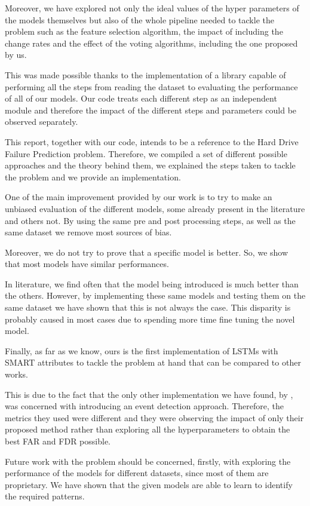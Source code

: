 Moreover, we have explored not only the ideal values of the hyper parameters of the models themselves but also of the whole pipeline needed to tackle the problem such as the feature selection algorithm, the impact of including the change rates and the effect of the voting algorithms, including the one proposed by us.

This was made possible thanks to the implementation of a library capable of performing all the steps from reading the dataset to evaluating the performance of all of our models.
Our code treats each different step as an independent module and therefore the impact of the different steps and parameters could be observed separately.

This report, together with our code, intends to be a reference to the Hard Drive Failure Prediction problem.
Therefore, we compiled a set of different possible approaches and the theory behind them, we explained the steps taken to tackle the problem and we provide an implementation.

One of the main improvement provided by our work is to try to make an unbiased evaluation of the different models, some already present in the literature and others not.
By using the same pre and post processing steps, as well as the same dataset we remove most sources of bias.

Moreover, we do not try to prove that a specific model is better.
So, we show that most models have similar performances.

In literature, we find often that the model being introduced is much better than the others. 
However, by implementing these same models and testing them on the same dataset we have shown that this is not always the case.
This disparity is probably caused in most cases due to spending more time fine tuning the novel model.

Finally, as far as we know, ours is the first implementation of LSTMs with SMART attributes to tackle the problem at hand that can be compared to other works.

This is due to the fact that the only other implementation we have found, by \cite{zhang2017deep}, was concerned with introducing an event detection approach.
Therefore, the metrics they used were different and they were observing the impact of only their proposed method rather than exploring all the hyperparameters to obtain the best FAR and FDR possible.

Future work with the problem should be concerned, firstly, with exploring the performance of the models for different datasets, since most of them are proprietary.
We have shown that the given models are able to learn to identify the required patterns.

